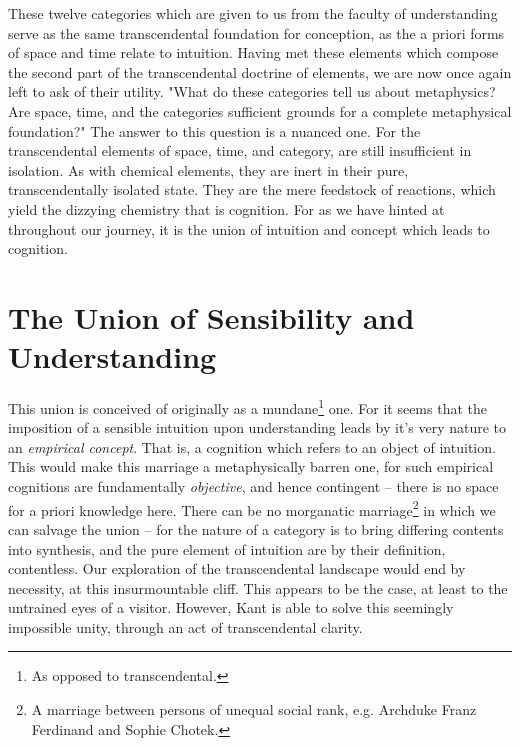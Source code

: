 

\noindent
These twelve categories which are given to us from the faculty of understanding serve as the same transcendental foundation for conception, as the a priori forms of space and time relate to intuition. Having met these elements which compose the second part of the transcendental doctrine of elements, we are now once again left to ask of their utility. "What do these categories tell us about metaphysics? Are space, time, and the categories sufficient grounds for a complete metaphysical foundation?" The answer to this question is a nuanced one. For the transcendental elements of space, time, and category, are still insufficient in isolation. As with chemical elements, they are inert in their pure, transcendentally isolated state. They are the mere feedstock of reactions, which yield the dizzying chemistry that is cognition. For as we have hinted at throughout our journey, it is the union of intuition and concept which leads to cognition.

\section*{The Union of Sensibility and Understanding}

This union is conceived of originally as a mundane\footnote{As opposed to transcendental.} one. For it seems that the imposition of a sensible intuition upon understanding leads by it's very nature to an \emph{empirical concept}. That is, a cognition which refers to an object of intuition. This would make this marriage a metaphysically barren one, for such empirical cognitions are fundamentally \emph{objective}, and hence contingent -- there is no space for a priori knowledge here. There can be no morganatic marriage\footnote{A marriage between persons of unequal social rank, e.g. Archduke Franz Ferdinand and Sophie Chotek.} in which we can salvage the union -- for the nature of a category is to bring differing contents into synthesis, and the pure element of intuition are by their definition, contentless. Our exploration of the transcendental landscape would end by necessity, at this insurmountable cliff. This appears to be the case, at least to the untrained eyes of a visitor. However, Kant is able to solve this seemingly impossible unity, through an act of transcendental clarity.

